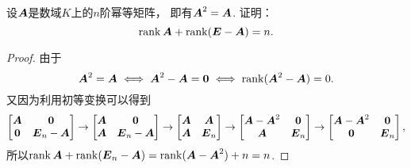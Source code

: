 \begin{example}\label{example:幂等矩阵.幂等矩阵的秩的性质1}
设\(\boldsymbol{A}\)是数域\(K\)上的\(n\)阶幂等矩阵，
即有\(\boldsymbol{A}^2=\boldsymbol{A}\).
证明：\[
	\rank\boldsymbol{A}+\rank(\boldsymbol{E}-\boldsymbol{A})=n.
\]
\begin{proof}
由于\[
	\boldsymbol{A}^2=\boldsymbol{A}
	\iff
	\boldsymbol{A}^2-\boldsymbol{A}=\boldsymbol0
	\iff
	\rank(\boldsymbol{A}^2-\boldsymbol{A})=0.
\]
又因为利用初等变换可以得到\[
	\begin{bmatrix}
		\boldsymbol{A} & \boldsymbol0 \\
		\boldsymbol0 & \boldsymbol{E}_n-\boldsymbol{A}
	\end{bmatrix}
	\to \begin{bmatrix}
		\boldsymbol{A} & \boldsymbol0 \\
		\boldsymbol{A} & \boldsymbol{E}_n-\boldsymbol{A}
	\end{bmatrix}
	\to \begin{bmatrix}
		\boldsymbol{A} & \boldsymbol{A} \\
		\boldsymbol{A} & \boldsymbol{E}_n
	\end{bmatrix}
	\to \begin{bmatrix}
		\boldsymbol{A}-\boldsymbol{A}^2 & \boldsymbol0 \\
		\boldsymbol{A} & \boldsymbol{E}_n
	\end{bmatrix}
	\to \begin{bmatrix}
		\boldsymbol{A}-\boldsymbol{A}^2 & \boldsymbol0 \\
		\boldsymbol0 & \boldsymbol{E}_n
	\end{bmatrix},
\]
所以\(\rank\boldsymbol{A}+\rank(\boldsymbol{E}_n-\boldsymbol{A})
=\rank(\boldsymbol{A}-\boldsymbol{A}^2)+n
=n\).
\end{proof}
\end{example}

